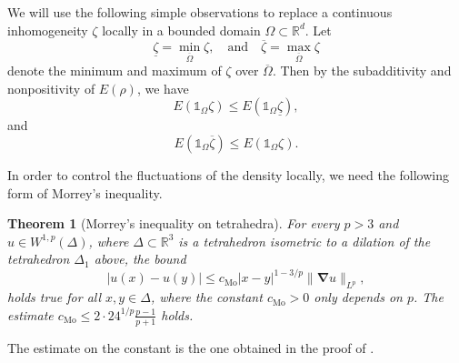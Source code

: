 \documentclass[final,onefignum,onetabnum,reqno]{amsart}
\newtheorem{theorem}{Theorem}[section]
\theoremstyle{remark}
\renewcommand{\le}{\leqslant}
\newcommand{\ol}[1]{\overline{#1}}
\newcommand{\ul}[1]{\underline{#1}}
\newcommand{\RR}{\mathbb{R}}
\newcommand{\Mo}{\mathrm{Mo}} %
\newcommand{\iden}{\mathbb{1}} %
\newcommand{\grad}{\bm{\nabla}} %
\newcommand{\tetra}{\mathbb{\Delta}} %
\begin{document}
We will use the following simple observations to replace a continuous inhomogeneity $\zeta$ locally in a bounded domain $\Omega\subset\RR^d$. Let 
$$
\ul{\zeta}=\min_{\ol{\Omega}}\zeta,\quad\text{and}\quad \ol{\zeta}=\max_{\ol{\Omega}}\zeta
$$
denote the minimum and maximum of $\zeta$ over $\ol{\Omega}$. Then by the subadditivity and nonpositivity of $E(\rho)$, we have
\begin{equation}\label{replmin}
E(\iden_\Omega \zeta)\le E(\iden_\Omega\ul{\zeta}),
\end{equation}
and
\begin{equation}\label{replmax}
E(\iden_\Omega\ol{\zeta})\le E(\iden_\Omega\zeta).
\end{equation}

In order to control the fluctuations of the density locally, we need the following form 
of Morrey's inequality.
\begin{theorem}[Morrey's inequality on tetrahedra]\label{morrineq}
For every $p>3$ and $u\in W^{1,p}(\tetra)$, where $\tetra\subset\RR^3$ is a tetrahedron isometric to a dilation of the tetrahedron $\tetra_1$ above, the bound
$$
|u(x)-u(y)|\le c_\Mo |x-y|^{1-3/p} \|\grad u\|_{L^p},
$$
holds true for all $x,y\in\tetra$, where the constant $c_\Mo>0$ only depends on $p$. The estimate $c_\Mo\le 2\cdot 24^{1/p}\frac{p-1}{p+1}$ holds.
\end{theorem}

The estimate on the constant is the one obtained in the proof of \cite[Lemma 4.28]{adams2003sobolev}.

\end{document}
